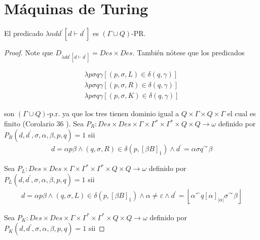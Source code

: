 \section{Máquinas de Turing}

  \begin{lemma}
  	El predicado $\lambda ndd^{\prime} \left[d\vdash d^{\prime}\right]$ es $(\Gamma \cup Q)$-PR.
	\begin{proof}
		Note que $D_{\lambda dd^{\prime}\left[d\vdash d^{\prime }\right] }=Des\times Des$.
    También nótese que los predicados

    \begin{eqnarray}
      \nonumber \lambda p\sigma q\gamma \left[ (p,\sigma ,L)\in \delta (q,\gamma )\right] \\
      \nonumber \lambda p\sigma q\gamma \left[ (p,\sigma ,R)\in \delta (q,\gamma )\right] \\
      \nonumber \lambda p\sigma q\gamma \left[ (p,\sigma ,K)\in \delta (q,\gamma )\right]
    \end{eqnarray}

    son $(\Gamma \cup Q)$-p.r. ya que los tres tienen dominio igual a $Q\times \Gamma \times Q\times \Gamma $ el cual es
    finito (Corolario 36 ). Sea $P_{R}:Des\times Des\times \Gamma \times \Gamma ^{\ast }\times \Gamma ^{\ast }\times
    Q\times Q\rightarrow \omega $
    definido por $P_{R}(d,d^{\prime },\sigma ,\alpha ,\beta ,p,q)=1$ sii
    \begin{eqnarray}
      \nonumber d=\alpha p\beta \wedge (q,\sigma ,R)\in \delta \left( p,\left[ \beta B\right] _{1}\right) \wedge
                d^{\prime }=\alpha \sigma q^{\curvearrowright }\beta
    \end{eqnarray}

    Sea $P_{L}:Des\times Des\times \Gamma \times \Gamma ^{\ast }\times \Gamma ^{\ast }\times Q\times Q\rightarrow \omega
    $ definido por $P_{L}(d,d^{\prime },\sigma ,\alpha ,\beta ,p,q)=1$ sii
    \begin{eqnarray}
      \nonumber d=\alpha p\beta \wedge (q,\sigma ,L)\in \delta \left( p,\left[ \beta B\right] _{1}\right) \wedge \alpha
                \neq \varepsilon \wedge d^{\prime }=\left\lfloor \alpha ^{\curvearrowleft }q\left[ \alpha \right]
                _{\left\vert \alpha \right\vert }\sigma ^{\curvearrowright }\beta \right\rfloor
    \end{eqnarray}

    Sea $P_{K}:Des\times Des\times \Gamma \times \Gamma ^{\ast }\times \Gamma ^{\ast }\times Q\times Q\rightarrow \omega
    $ definido por $P_{K}(d,d^{\prime },\sigma ,\alpha ,\beta ,p,q)=1$ sii


\end{proof}
\end{lemma}
